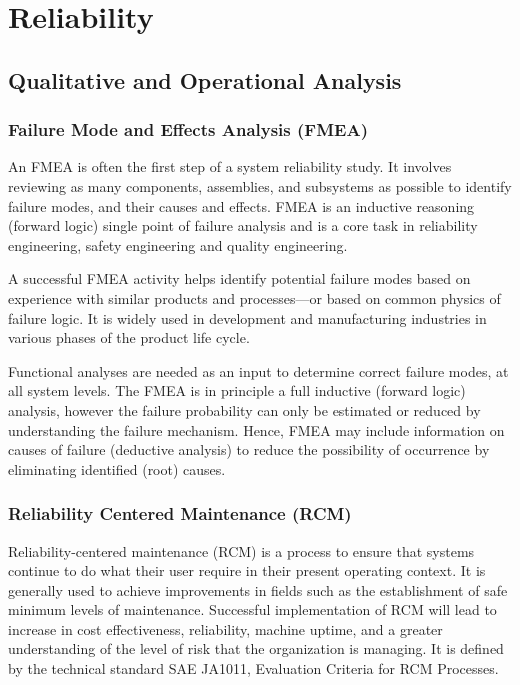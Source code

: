 \section{Reliability}\label{33}
\subsection{Qualitative and Operational Analysis}
\subsubsection{Failure Mode and Effects Analysis (FMEA)}
An FMEA is often the first step of a system reliability study. It involves reviewing as many components, assemblies, and subsystems as possible to identify failure modes, and their causes and effects.  
FMEA is an inductive reasoning (forward logic) single point of failure analysis and is a core task in reliability engineering, safety engineering and quality engineering.

A successful FMEA activity helps identify potential failure modes based on experience with similar products and processes—or based on common physics of failure logic. It is widely used in development and manufacturing industries in various phases of the product life cycle. 

Functional analyses are needed as an input to determine correct failure modes, at all system levels. The FMEA is in principle a full inductive (forward logic) analysis, however the failure probability can only be estimated or reduced by understanding the failure mechanism. Hence, FMEA may include information on causes of failure (deductive analysis) to reduce the possibility of occurrence by eliminating identified (root) causes.

\subsubsection{Reliability Centered Maintenance (RCM) }
Reliability-centered maintenance (RCM) is a process to ensure that systems continue to do what their user require in their present operating context. It is generally used to achieve improvements in fields such as the establishment of safe minimum levels of maintenance. Successful implementation of RCM will lead to increase in cost effectiveness, reliability, machine uptime, and a greater understanding of the level of risk that the organization is managing. It is defined by the technical standard SAE JA1011, Evaluation Criteria for RCM Processes.

